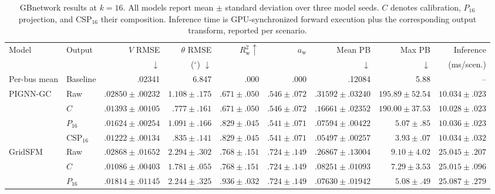 \documentclass{article}
\begin{document}
\begin{table}[t]
\centering
\caption{
GBnetwork results at $k=16$.
All models report mean $\pm$ standard deviation over three model seeds.
$C$ denotes calibration, $P_{16}$ projection, and CSP$_{16}$ their
composition. Inference time is GPU-synchronized forward execution plus
the corresponding output transform, reported per scenario.
}
\label{tab:intervention}
\setlength{\tabcolsep}{2.5pt}
\begin{tabular}{llrrrrrrr}
\toprule
Model & Output &
$V$ RMSE &
$\theta$ RMSE &
$R_{\mathrm{w}}^2 \uparrow$ &
$a_{\mathrm{w}}$ &
Mean PB &
Max PB &
Inference \\
& & $\downarrow$ & ($^\circ$) $\downarrow$ & & & $\downarrow$ & $\downarrow$ & (ms/scen.) \\
\midrule

Per-bus mean
& Baseline
& .02341
& 6.847
& .000
& .000
& .12084
& 5.88
& -- \\

\midrule
PIGNN-GC
& Raw
& $.02850{\pm}.00232$
& $1.108{\pm}.175$
& $.671{\pm}.050$
& $.546{\pm}.072$
& $.31592{\pm}.03240$
& $195.89{\pm}52.54$
& $10.034{\pm}.023$ \\

& $C$
& $.01393{\pm}.00105$
& $\mathbf{.777{\pm}.161}$
& $.671{\pm}.050$
& $.546{\pm}.072$
& $.16661{\pm}.02352$
& $190.00{\pm}37.53$
& $10.028{\pm}.023$ \\

& $P_{16}$
& $.01624{\pm}.00254$
& $1.091{\pm}.166$
& $\mathbf{.829{\pm}.045}$
& $.541{\pm}.071$
& $.07594{\pm}.00422$
& $5.07{\pm}.85$
& $10.036{\pm}.023$ \\

& CSP$_{16}$
& $\mathbf{.01222{\pm}.00134}$
& $.835{\pm}.141$
& $\mathbf{.829{\pm}.045}$
& $.541{\pm}.071$
& $\mathbf{.05497{\pm}.00257}$
& $\mathbf{3.93{\pm}.07}$
& $10.034{\pm}.032$ \\

\midrule
GridSFM
& Raw
& $.02868{\pm}.01652$
& $2.294{\pm}.302$
& $.768{\pm}.151$
& $.724{\pm}.149$
& $.26867{\pm}.13004$
& $9.10{\pm}4.02$
& $25.045{\pm}.207$ \\

& $C$
& $.01086{\pm}.00403$
& $\mathbf{1.781{\pm}.055}$
& $.768{\pm}.151$
& $.724{\pm}.149$
& $.08251{\pm}.01093$
& $7.29{\pm}3.53$
& $25.015{\pm}.096$ \\

& $P_{16}$
& $.01814{\pm}.01145$
& $2.244{\pm}.325$
& $\mathbf{.936{\pm}.032}$
& $.724{\pm}.149$
& $.07630{\pm}.01942$
& $5.08{\pm}.49$
& $25.087{\pm}.279$ \\


\end{tabular}
\end{table}
\end{document}
